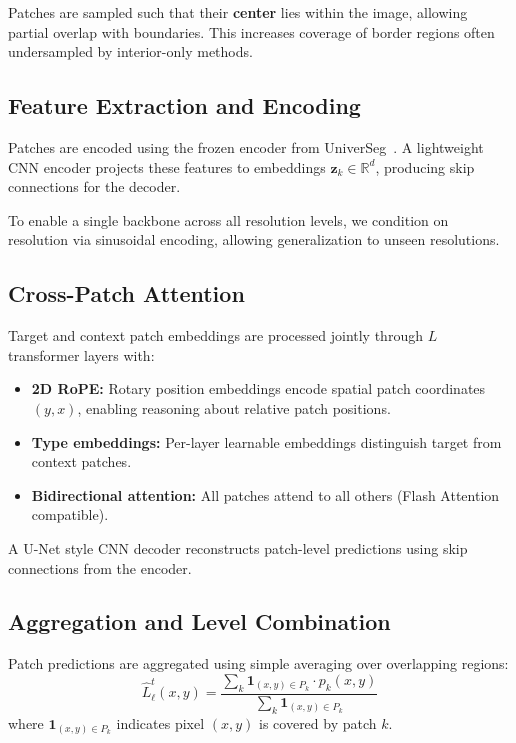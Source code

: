 \documentclass[runningheads]{llncs}
\begin{document}
Patches are sampled such that their \textbf{center} lies within the image, allowing partial overlap with boundaries. This increases coverage of border regions often undersampled by interior-only methods.

\subsection{Feature Extraction and Encoding}

Patches are encoded using the frozen encoder from UniverSeg~\cite{butoiUniverSegUniversalMedical2023}. A lightweight CNN encoder projects these features to embeddings $\mathbf{z}_k \in \mathbb{R}^{d}$, producing skip connections for the decoder.

To enable a single backbone across all resolution levels, we condition on resolution via sinusoidal encoding, allowing generalization to unseen resolutions.

\subsection{Cross-Patch Attention}

Target and context patch embeddings are processed jointly through $L$ transformer layers with:
\begin{itemize}
    \item \textbf{2D RoPE:} Rotary position embeddings encode spatial patch coordinates $(y, x)$, enabling reasoning about relative patch positions.
    \item \textbf{Type embeddings:} Per-layer learnable embeddings distinguish target from context patches.
    \item \textbf{Bidirectional attention:} All patches attend to all others (Flash Attention compatible).
\end{itemize}

A U-Net style CNN decoder reconstructs patch-level predictions using skip connections from the encoder.

\subsection{Aggregation and Level Combination}

Patch predictions are aggregated using simple averaging over overlapping regions:
\begin{equation}
    \hat{L}^t_\ell(x,y) = \frac{\sum_{k} \mathbf{1}_{(x,y) \in P_k} \cdot p_k(x,y)}{\sum_{k} \mathbf{1}_{(x,y) \in P_k}}
\end{equation}
where $\mathbf{1}_{(x,y) \in P_k}$ indicates pixel $(x,y)$ is covered by patch $k$.
\end{document}
